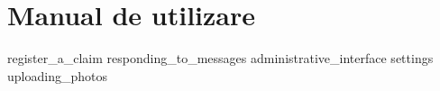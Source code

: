 \chapter{Manual de utilizare}
{register_a_claim}
{responding_to_messages}
{administrative_interface}
{settings}
{uploading_photos}
